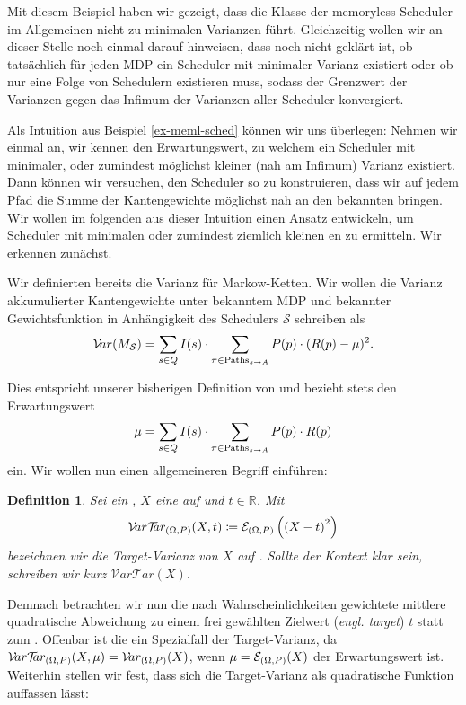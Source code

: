 \documentclass[a4paper]{article}
\newcommand{\mc}{Markow-Kette}
\newtheorem{definition}[satz]{Definition} %
\theoremstyle{nonumberplain}
\begin{document}
Mit diesem Beispiel haben wir gezeigt, dass die Klasse der memoryless Scheduler im Allgemeinen nicht zu minimalen Varianzen führt. Gleichzeitig wollen wir an dieser Stelle noch einmal darauf hinweisen, dass noch nicht geklärt ist, ob tatsächlich für jeden MDP ein Scheduler mit minimaler Varianz existiert oder ob nur eine Folge von Schedulern existieren muss, sodass der Grenzwert der Varianzen gegen das Infimum der Varianzen aller Scheduler konvergiert.

Als Intuition aus Beispiel \ref{ex-meml-sched} können wir uns überlegen: Nehmen wir einmal an, wir kennen den Erwartungswert, zu welchem ein Scheduler mit minimaler, oder zumindest möglichst kleiner (nah am Infimum) Varianz existiert. Dann können wir versuchen, den Scheduler so zu konstruieren, dass wir auf jedem Pfad die Summe der Kantengewichte möglichst nah an den bekannten \expect{} bringen. Wir wollen im folgenden aus dieser Intuition einen Ansatz entwickeln, um Scheduler mit minimalen oder zumindest ziemlich kleinen \var{}en zu ermitteln.
Wir erkennen zunächst.

Wir definierten bereits die Varianz für \mc{}n. Wir wollen die Varianz akkumulierter Kantengewichte unter bekanntem MDP und bekannter Gewichtsfunktion in Anhängigkeit des Schedulers $\mathcal{S}$ schreiben als
\[
\mathcal{V}\!ar(M_{\mathcal{S}}) = \sum_{s \in Q}{I(s)} \cdot \sum_{\pi \in \mathrm{Paths}_{s \rightarrow A}}{P(p) \cdot (R(p) - \mu)^2}\text{.}
\]

Dies entspricht unserer bisherigen Definition von \var{} und bezieht stets den Erwartungswert
\[
\mu = \sum_{s \in Q}{I(s)} \cdot \sum_{\pi \in \mathrm{Paths}_{s \rightarrow A}}{P(p) \cdot R(p)}
\]
ein. Wir wollen nun einen allgemeineren Begriff einführen:
\newcommand{\vt}{Target-Varianz}
\newcommand{\mvt}{\mathcal{V}\!ar \mathcal{T}\!\!ar}
\newcommand{\vtex}{$\mvt(M_{\mathcal{S}},x)$}
\begin{definition}
		Sei \probspaceex{} ein \probspace{}, $X$ eine \rvar{} auf \probspaceex{} und $t \in \mathbb{R}$. Mit
	\begin{equation}
	\mvt_{\probspaceexraw{}}(X,t) \coloneqq \mathcal{E}_{\probspaceexraw{}}\left(\left(X - t\right)^{2}\right)
	\end{equation}
	bezeichnen wir die \vt{} von $X$ auf  \probspaceex{}. Sollte der Kontext \probspaceex{} klar sein, schreiben wir kurz $\mvt(X)$.
	

\end{definition}

Demnach betrachten wir nun die nach Wahrscheinlichkeiten gewichtete mittlere quadratische Abweichung zu einem frei gewählten Zielwert (\textit{engl. target}) $t$ statt zum \expect{}. Offenbar ist die \var{} ein Spezialfall der \vt{}, da $\mvt_{\probspaceexraw{}}(X,\mu) = \mvar_{\probspaceexraw{}}(X)$, wenn $\mu = \mathcal{E}_{(\Omega, P){}}(X)$ der Erwartungswert ist. Weiterhin stellen wir fest, dass sich die \vt{} als quadratische Funktion auffassen lässt:
\end{document}

